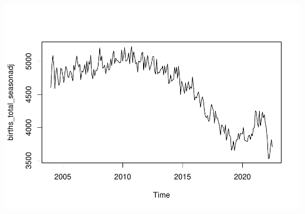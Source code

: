 \documentclass[
]{article}
\begin{document}
\includegraphics{GoogleTrendsMarkdown_files/figure-latex/unnamed-chunk-10-2.pdf}
\end{document}
